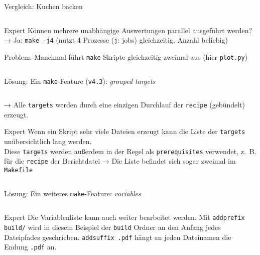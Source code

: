 
\begin{frame}[fragile]{Vergleich: Kuchen backen}
  \begin{center}
    \inputminted{make}{example-files/Cake}
  \end{center}
\end{frame}

\begin{frame}[fragile]{Expert}
  Können mehrere unabhängige Auswertungen parallel ausgeführt werden? \\
  → Ja: \;\texttt{make -j4}\; (nutzt 4 Prozesse (\texttt{j}: jobs) gleichzeitig, Anzahl beliebig)

  Problem: Manchmal führt \texttt{make} Skripte gleichzeitig zweimal aus (hier \texttt{plot.py})
  \begin{center}
    \small
    \inputminted{make}{example-files/Advanced-0}
  \end{center}

  Lösung: Ein \texttt{make}-Feature (\texttt{v4.3}): \emph{grouped targets}
  \begin{center}
    \small
    \inputminted{make}{example-files/Advanced-1}
  \end{center}
   → Alle \texttt{targets} werden durch eine einzigen Durchlauf der \texttt{recipe} (gebündelt) erzeugt.
\end{frame}

\begin{frame}[fragile]{Expert}
  Wenn ein Skript sehr viele Dateien erzeugt kann die Liste der \texttt{targets} unübersichtlich lang werden.\\
  Diese \texttt{targets} werden außerdem in der Regel als \texttt{prerequisites} verwendet,
  z.~B. für die \texttt{recipe} der Berichtdatei  → Die Liste befindet sich sogar zweimal im \texttt{Makefile}

  \begin{center}
    \small
    \inputminted{make}{example-files/Advanced-2}
  \end{center}
  Lösung: Ein weiteres \texttt{make}-Feature: \emph{variables}
  \begin{center}
    \small
    \inputminted{make}{example-files/Advanced-3}
  \end{center}
\end{frame}

\begin{frame}[fragile]{Expert}
  Die Variablenliste kann auch weiter bearbeitet werden.
  Mit \texttt{addprefix build/} wird in diesem Beispiel der \texttt{build} Ordner
  an den Anfang jedes Dateipfades geschrieben.
  \texttt{addsuffix .pdf} hängt an jeden Dateinamen die Endung \texttt{.pdf} an.
  \begin{center}
    \small
    \inputminted{make}{example-files/Advanced-4}
  \end{center}
\end{frame}
